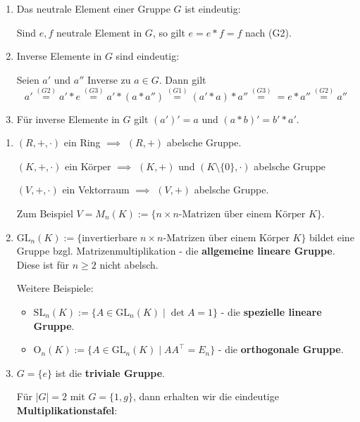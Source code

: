 \begin{rem}\label{rem1_2}
	\begin{enumerate}[label=(\roman*)]
		\item Das neutrale Element einer Gruppe $G$ ist eindeutig:
		
		Sind $e, f$ neutrale Element in $G$, so gilt $e = e * f = f$ nach (G2).
		
		\item Inverse Elemente in $G$ sind eindeutig:
		
		Seien $a'$ und $a''$ Inverse zu $a \in G$. Dann gilt
		\[a' \overset{(G2)}{=}  a' * e \overset{(G3)}{=} a' * (a * a'') \overset{(G1)}{=}  ( a' * a) * a'' \overset{(G3)}{=} = e * a'' \overset{(G2)}{=} a''\]
		
		\item Für inverse Elemente in $G$ gilt $(a')' = a$ und $(a * b)' = b' * a'$.
	\end{enumerate}
	\begin{beispiel}\label{beispiel1_3}
		\begin{enumerate}
			\item $(R, +, \cdot)$ ein Ring $\implies$ $(R, +)$ abelsche Gruppe.
			
			 $(K, +, \cdot)$ ein Körper $\implies$ $(K, +)$ und $(K\setminus \{0\}, \cdot)$ abelsche Gruppe
			 
			$(V, +, \cdot)$ ein Vektorraum $\implies$ $(V, +)$ abelsche Gruppe.
			
			Zum Beispiel $V = M_n (K) := \{ n\times n\text{-Matrizen über einem Körper } K\}$.
			
			\item $\mathrm{GL}_n(K) := \{\text{invertierbare } n\times n\text{-Matrizen über einem Körper } K\}$ bildet eine Gruppe bzgl. Matrizenmultiplikation - die \textbf{allgemeine lineare Gruppe}. Diese ist für $n \geq 2$ nicht abelsch. 
			
			Weitere Beispiele: 
			\begin{itemize}
				\item $\mathrm{SL}_n(K) := \{A \in \mathrm{GL}_n(K) \mid \det A = 1\}$ - die \textbf{spezielle lineare Gruppe}.
				\item $\mathrm{O}_n(K) := \{A \in \mathrm{GL}_n(K) \mid AA^\top = E_n\}$ - die \textbf{orthogonale Gruppe}.
			\end{itemize}
			
			\item $G = \{e\}$ ist die \textbf{triviale Gruppe}.
			
			Für $|G| = 2$ mit $G = \{1, g\}$, dann erhalten wir die eindeutige \textbf{Multiplikationstafel}:
			

\end{enumerate}
\end{beispiel}
\end{rem}
